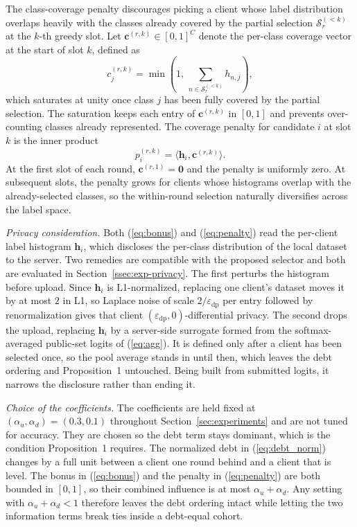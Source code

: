 \documentclass[journal]{IEEEtran}
\newcommand{\new}[1]{#1}
\newcommand{\rev}[1]{{\color{blue}#1}}
\begin{document}
The class-coverage penalty discourages picking a client whose label distribution overlaps heavily with the classes already covered by the partial selection $\mathcal{S}_r^{(<k)}$ at the $k$-th greedy slot. Let $\bm{c}^{(r,k)} \in [0,1]^{C}$ denote the per-class coverage vector at the start of slot $k$, defined as
\begin{equation}
c_{j}^{(r,k)} = \min\!\left(1,\, \sum_{n \in \mathcal{S}_r^{(<k)}} h_{n,j}\right),
\label{eq:cov}
\end{equation}
which saturates at unity once class $j$ has been fully covered by the partial selection. The saturation keeps each entry of $\bm{c}^{(r,k)}$ in $[0,1]$ and prevents over-counting classes already represented. The coverage penalty for candidate $i$ at slot $k$ is the inner product
\begin{equation}
p_i^{(r,k)} = \langle \bm{h}_i, \bm{c}^{(r,k)} \rangle.
\label{eq:penalty}
\end{equation}
At the first slot of each round, $\bm{c}^{(r,1)} = \bm{0}$ and the penalty is uniformly zero. At subsequent slots, the penalty grows for clients whose histograms overlap with the already-selected classes, so the within-round selection naturally diversifies across the label space.

\new{\textit{Privacy consideration.} Both (\ref{eq:bonus}) and (\ref{eq:penalty}) read the per-client label histogram $\bm{h}_i$, which discloses the per-class distribution of the local dataset to the server. Two remedies are compatible with the proposed selector and both are evaluated in Section~\ref{ssec:exp-privacy}.} \rev{The first perturbs the histogram before upload. Since $\bm{h}_i$ is L1-normalized, replacing one client's dataset moves it by at most $2$ in L1, so Laplace noise of scale $2/\varepsilon_{\mathrm{dp}}$ per entry followed by renormalization gives that client $(\varepsilon_{\mathrm{dp}}, 0)$-differential privacy. The second drops the upload, replacing $\bm{h}_i$ by a server-side surrogate formed from the softmax-averaged public-set logits of (\ref{eq:agg}). It is defined only after a client has been selected once, so the pool average stands in until then, which leaves the debt ordering and Proposition~1 untouched. Being built from submitted logits, it narrows the disclosure rather than ending it.}

\rev{\textit{Choice of the coefficients.} The coefficients are held fixed at $(\alpha_u, \alpha_d) = (0.3, 0.1)$ throughout Section~\ref{sec:experiments} and are not tuned for accuracy. They are chosen so the debt term stays dominant, which is the condition Proposition~1 requires. The normalized debt in (\ref{eq:debt_norm}) changes by a full unit between a client one round behind and a client that is level. The bonus in (\ref{eq:bonus}) and the penalty in (\ref{eq:penalty}) are both bounded in $[0,1]$, so their combined influence is at most $\alpha_u + \alpha_d$. Any setting with $\alpha_u + \alpha_d < 1$ therefore leaves the debt ordering intact while letting the two information terms break ties inside a debt-equal cohort.}
\end{document}
